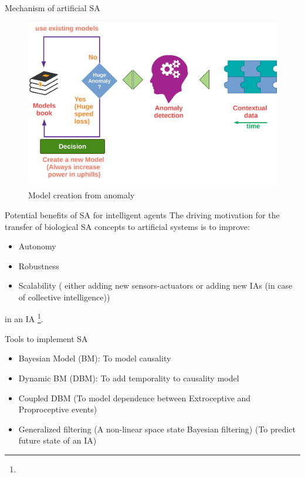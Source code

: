 \documentclass[unknownkeysallowed]{beamer}
\begin{document}
\begin{frame}{Mechanism of artificial SA}
	\begin{figure}
		\includegraphics[scale=0.8]{sa-model-creation.png}
		\caption{Model creation from anomaly}
	\end{figure}
\end{frame}

\begin{frame}{Potential benefits of SA for intelligent agents}
	The driving motivation for the transfer of biological SA concepts
	to artificial systems is to improve:
	\begin{itemize}
		\item Autonomy
		\item Robustness
		\item Scalability ( either adding new sensors-actuators or adding new IAs (in case of collective intelligence))
	\end{itemize}
	in an IA \footnote{}.
\end{frame}

\begin{frame}{Tools to implement SA}
	\begin{itemize}
		\item Bayesian Model (BM): To model causality 
		\item Dynamic BM (DBM): To add temporality to causality model 
		\item Coupled DBM (To model dependence between Extroceptive and Proproceptive events)
		\item Generalized filtering (A non-linear space state Bayesian filtering) (To predict future state of an IA)
	\end{itemize}
\end{frame}
\end{document}
